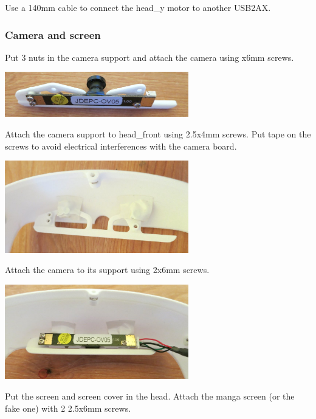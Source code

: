\documentclass{article}
\begin{document}
Use a 140mm cable to connect the head\_y motor to another USB2AX.

\subsubsection{Camera and screen}



Put 3  nuts in the camera support and attach the camera using  x6mm screws.

\begin{center}
  \includegraphics[width=0.6\textwidth]{img/head_camera1}
 \end{center}


Attach the camera support to head\_front using \diameter 2.5x4mm screws. Put tape on the screws to avoid electrical interferences with the camera board.

\begin{center}
  \includegraphics[width=0.6\textwidth]{img/head_camera2}
 \end{center}

Attach the camera to its support using \diameter 2x6mm screws.

\begin{center}
  \includegraphics[width=0.6\textwidth]{img/head_camera3}
 \end{center}

Put the screen and screen cover in the head. Attach the manga screen (or the fake one) with 2 \diameter 2.5x6mm screws.
\end{document}
